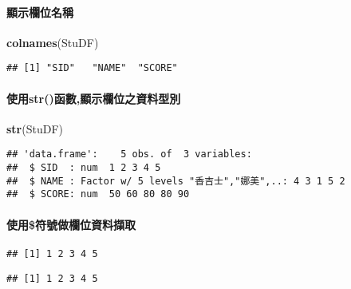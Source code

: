 \documentclass[
]{article}
\newenvironment{Shaded}{\begin{snugshade}}{\end{snugshade}}
\newcommand{\KeywordTok}[1]{\textcolor[rgb]{0.13,0.29,0.53}{\textbf{#1}}}
\newcommand{\NormalTok}[1]{#1}
\newcommand{\OperatorTok}[1]{\textcolor[rgb]{0.81,0.36,0.00}{\textbf{#1}}}
\begin{document}
\hypertarget{ux986fux793aux6b04ux4f4dux540dux7a31}{%
\paragraph{顯示欄位名稱}\label{ux986fux793aux6b04ux4f4dux540dux7a31}}

\begin{Shaded}
\begin{Highlighting}[]
\KeywordTok{colnames}\NormalTok{(StuDF)}
\end{Highlighting}
\end{Shaded}

\begin{verbatim}
## [1] "SID"   "NAME"  "SCORE"
\end{verbatim}

\hypertarget{ux4f7fux7528strux51fdux6578ux986fux793aux6b04ux4f4dux4e4bux8cc7ux6599ux578bux5225}{%
\paragraph{使用str()函數,顯示欄位之資料型別}\label{ux4f7fux7528strux51fdux6578ux986fux793aux6b04ux4f4dux4e4bux8cc7ux6599ux578bux5225}}

\begin{Shaded}
\begin{Highlighting}[]
\KeywordTok{str}\NormalTok{(StuDF) }
\end{Highlighting}
\end{Shaded}

\begin{verbatim}
## 'data.frame':    5 obs. of  3 variables:
##  $ SID  : num  1 2 3 4 5
##  $ NAME : Factor w/ 5 levels "香吉士","娜美",..: 4 3 1 5 2
##  $ SCORE: num  50 60 80 80 90
\end{verbatim}

\hypertarget{ux4f7fux7528ux7b26ux865fux505aux6b04ux4f4dux8cc7ux6599ux64f7ux53d6}{%
\paragraph{使用\$符號做欄位資料擷取}\label{ux4f7fux7528ux7b26ux865fux505aux6b04ux4f4dux8cc7ux6599ux64f7ux53d6}}

\begin{Shaded}
\end{Shaded}

\begin{verbatim}
## [1] 1 2 3 4 5
\end{verbatim}

\begin{Shaded}
\end{Shaded}

\begin{verbatim}
## [1] 1 2 3 4 5
\end{verbatim}
\end{document}
